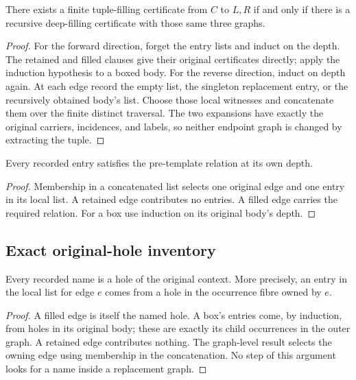 \begin{theorem}
There exists a finite tuple-filling certificate from $C$ to $L,R$ if and only
if there is a recursive deep-filling certificate with those same three graphs.
\end{theorem}
\begin{proof}
For the forward direction, forget the entry lists and induct on the depth.
The retained and filled clauses give their original certificates directly;
apply the induction hypothesis to a boxed body. For the reverse direction,
induct on depth again. At each edge record the empty list, the singleton
replacement entry, or the recursively obtained body's list. Choose those
local witnesses and concatenate them over the finite distinct traversal.
The two expansions have exactly the original carriers, incidences, and labels,
so neither endpoint graph is changed by extracting the tuple.
\end{proof}

\begin{lemma}
Every recorded entry satisfies the pre-template relation at its own depth.
\end{lemma}
\begin{proof}
Membership in a concatenated list selects one original edge and one entry in
its local list. A retained edge contributes no entries. A filled edge carries
the required relation. For a box use induction on its original body's depth.
\end{proof}

\subsection{Exact original-hole inventory}
\begin{lemma}[Provenance]
Every recorded name is a hole of the original context. More precisely, an
entry in the local list for edge $e$ comes from a hole in the occurrence fibre
owned by $e$.
\end{lemma}
\begin{proof}
A filled edge is itself the named hole. A box's entries come, by induction,
from holes in its original body; these are exactly its child occurrences in
the outer graph. A retained edge contributes nothing. The graph-level result
selects the owning edge using membership in the concatenation. No step of
this argument looks for a name inside a replacement graph.
\end{proof}

